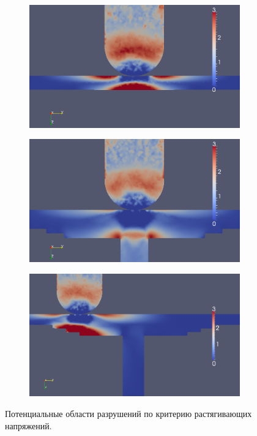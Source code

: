 \begin{figure}[h]
\begin{subfigure}[b]{0.3\textwidth}
\center
\includegraphics[width=\textwidth]{png/pkm-experiment/wing-only/tension-2.png}
\end{subfigure}
\begin{subfigure}[b]{0.3\textwidth}
\center
\includegraphics[width=\textwidth]{png/pkm-experiment/wing-stringer/tension-2.png}
\end{subfigure}
\begin{subfigure}[b]{0.3\textwidth}
\center
\includegraphics[width=\textwidth]{png/pkm-experiment/wing-stringer-non-center/tension-2.png}
\end{subfigure}
\caption{Потенциальные области разрушений по критерию растягивающих напряжений.}
\label{pic:pkm_experiment_compare_tension}
\end{figure}



